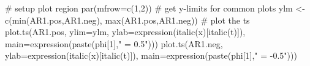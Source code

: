 \begin{Schunk}
\begin{Sinput}
 # setup plot region
 par(mfrow=c(1,2))
 # get y-limits for common plots
 ylm <- c(min(AR1.pos,AR1.neg), max(AR1.pos,AR1.neg))
 # plot the ts
 plot.ts(AR1.pos, ylim=ylm,
         ylab=expression(italic(x)[italic(t)]),
         main=expression(paste(phi[1]," = 0.5")))
 plot.ts(AR1.neg,
         ylab=expression(italic(x)[italic(t)]),
         main=expression(paste(phi[1]," = -0.5")))
\end{Sinput}
\end{Schunk}
